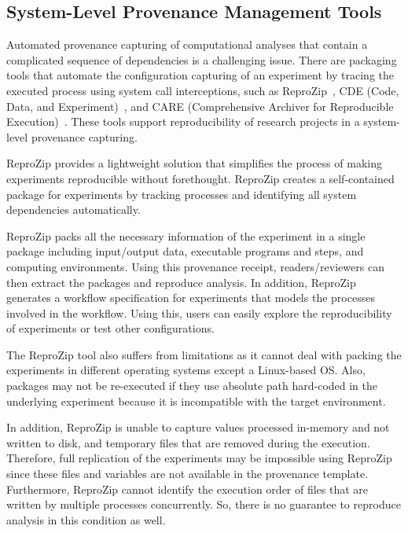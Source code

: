 \subsection{System-Level Provenance Management Tools}

Automated provenance capturing of computational analyses that 
contain a complicated sequence of dependencies is a challenging issue. 
There are packaging tools that automate the configuration capturing of 
an experiment by tracing the executed process using system call 
interceptions, such as ReproZip~\cite{chirigati2016reprozip}, CDE 
(Code, Data, and Experiment)~\cite{guo2012cde}, and CARE (Comprehensive 
Archiver for Reproducible Execution)~\cite{janin2014care}. These tools 
support reproducibility of research projects in a system-level 
provenance capturing. 

ReproZip provides a lightweight solution 
that simplifies the process of making experiments reproducible without 
forethought. ReproZip creates a self-contained package for experiments 
by tracking processes and identifying all system dependencies 
automatically. 

ReproZip packs all the necessary information of the experiment in a 
single package including input/output data, executable programs and 
steps, and computing environments. Using this provenance receipt, 
readers/reviewers can then extract the packages and reproduce analysis. 
In addition, ReproZip generates a workflow specification for 
experiments that models the processes involved in the workflow. Using 
this, users can easily explore the reproducibility of experiments or test 
other configurations. 

The ReproZip tool also suffers from limitations as it cannot deal with 
packing the experiments in different operating systems except a 
Linux-based OS. Also, packages may not be re-executed if they use 
absolute path hard-coded in the underlying experiment because it 
is incompatible with the target environment. 

In addition, ReproZip is unable to capture values processed in-memory 
and not written to disk, and temporary files that are removed 
during the execution. Therefore, full replication of the experiments 
may be impossible using ReproZip since these files and variables are 
not available in the provenance template. 
Furthermore, ReproZip cannot 
identify the execution order of files that are written by multiple 
processes concurrently. So, there is no guarantee to reproduce analysis 
in this condition as well.

